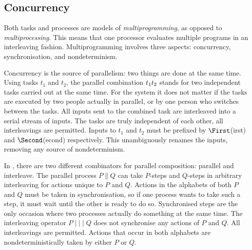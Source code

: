 



\subsection{Concurrency}

Both tasks and processes are models of \emph{multiprogramming}, as opposed to \emph{multiprocessing}.
This means that one processor evaluates multiple programs in an interleaving fashion.
Multiprogramming involves three aspects: concurrency, synchronisation, and nondeterminism.

Concurrency is the source of parallelism: two things are done at the same time.
%
Using tasks $t_1$ and $t_2$, the parallel combination $t_1 \relax t_2$ stands for two independent tasks carried out at the same time.
For the system it does not matter if the tasks are executed by two people actually in parallel, or by one person who switches between the tasks.
All inputs sent to the combined task are interleaved into a serial stream of inputs.
The tasks are truly independent of each other, all interleavings are permitted.
Inputs to $t_1$ and $t_2$ must be prefixed by $\First$(irst) and $\Second$(econd) respectively.
This unambiguously renames the inputs, removing any source of nondeterminism.

In \CSP, there are two different combinators for parallel composition: parallel and interleave.
The parallel process $P \parallel Q$ can take $P$-steps and $Q$-steps in arbitrary interleaving for actions unique to $P$ and $Q$.
Actions in the alphabets of both $P$ and $Q$ must be taken in synchronisation, so if one process wants to take such a step, it must wait until the other is ready to do so.
Synchronised steps are the only occasion where two processes actually do something at the same time.
%
The interleaving operator $P \mid\mid\mid Q$ does not synchronise any actions of $P$ and $Q$.
All interleavings are permitted.
Actions that occur in both alphabets are nondeterministically taken by either $P$ or $Q$.

